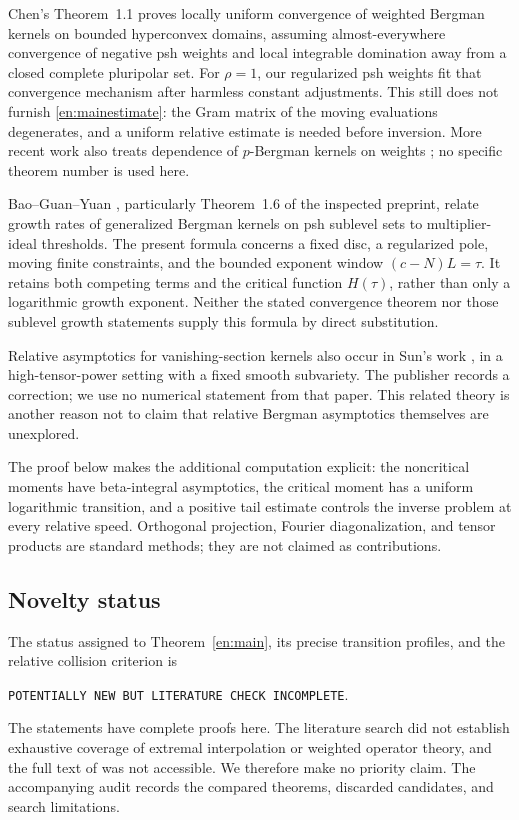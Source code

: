\documentclass[12pt]{amsart}
\theoremstyle{definition}
\theoremstyle{remark}
\numberwithin{equation}{section}
\theoremstyle{definition}
\begin{document}
Chen's Theorem~1.1 \cite{Chen15} proves locally uniform convergence of
weighted Bergman kernels on bounded hyperconvex domains, assuming
almost-everywhere convergence of negative psh weights and local
integrable domination away from a closed complete pluripolar set.
For $\rho=1$, our regularized psh weights fit that convergence mechanism
after harmless constant adjustments. This still does not furnish
\eqref{en:mainestimate}: the Gram matrix of the moving evaluations
degenerates, and a uniform relative estimate is needed before inversion.
More recent work also treats dependence of $p$-Bergman kernels on
weights \cite{Zyn26}; no specific theorem number is used here.

Bao--Guan--Yuan \cite{BGY25}, particularly Theorem~1.6 of the inspected
preprint, relate growth rates of generalized Bergman kernels on psh
sublevel sets to multiplier-ideal thresholds. The present formula
concerns a fixed disc, a regularized pole, moving finite constraints,
and the bounded exponent window $(c-N)L=\tau$. It retains both competing
terms and the critical function $H(\tau)$, rather than only a logarithmic
growth exponent. Neither the stated convergence theorem nor those
sublevel growth statements supply this formula by direct substitution.

Relative asymptotics for vanishing-section kernels also occur in
Sun's work \cite{Sun21}, in a high-tensor-power setting with a fixed
smooth subvariety. The publisher records a correction; we use no
numerical statement from that paper. This related theory is another
reason not to claim that relative Bergman asymptotics themselves
are unexplored.

The proof below makes the additional computation explicit: the
noncritical moments have beta-integral asymptotics, the critical moment
has a uniform logarithmic transition, and a positive tail estimate
controls the inverse problem at every relative speed. Orthogonal
projection, Fourier diagonalization, and tensor products are standard
methods; they are not claimed as contributions.

\subsection{Novelty status}
The status assigned to Theorem~\ref{en:main}, its precise transition
profiles, and the relative collision criterion is
\begin{center}\small
\texttt{POTENTIALLY NEW BUT LITERATURE CHECK INCOMPLETE}.
\end{center}
The statements have complete proofs here. The literature search did not
establish exhaustive coverage of extremal interpolation or weighted
operator theory, and the full text of \cite{LXZ23} was not accessible.
We therefore make no priority claim. The accompanying audit records
the compared theorems, discarded candidates, and search limitations.
\end{document}
